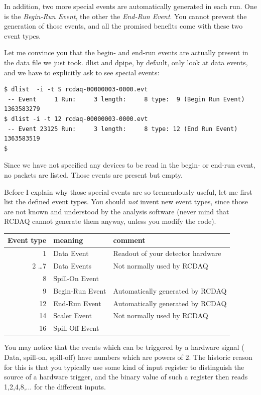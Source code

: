 \documentclass{article}[11pt]
\begin{document}
In addition, two more special events are automatically generated in
each run.  One is the \emph{Begin-Run Event}, the other the
\emph{End-Run Event}. You cannot prevent the generation of those
events, and all the promised benefits come with these two event types.

Let me convince you that the begin- and end-run events are actually present in
the data file we just took. dlist and dpipe, by default, only look at
data events, and we have to explicitly ask to see special events:

\begin{verbatim}
$ dlist  -i -t S rcdaq-00000003-0000.evt
 -- Event     1 Run:     3 length:     8 type:  9 (Begin Run Event)  1363583279
$ dlist -i -t 12 rcdaq-00000003-0000.evt
 -- Event 23125 Run:     3 length:     8 type: 12 (End Run Event)  1363583519
$ 
\end{verbatim}

Since we have not specified any devices to be read in the begin- or end-run event,
no packets are listed. Those events are present but empty.

Before I explain why those special events are so tremendously useful,
let me first list the defined event types. You should \emph{not}
invent new event types, since those are not known and understood by the
analysis software (never mind that RCDAQ cannot generate them anyway,
unless you modify the code).

\begin{center}
\begin{tabular}{|r|l|l|}
\hline
Event type & meaning & comment \\
\hline
\hline
    1 & Data Event &  Readout of your detector hardware\\ \hline
    2 \dots 7 & Data Events & Not normally used by RCDAQ \\ \hline
    8  & Spill-On Event &  \\ \hline
    9  & Begin-Run Event & Automatically generated by RCDAQ \\ \hline
    12 & End-Run Event & Automatically generated by RCDAQ  \\ \hline
    14 & Scaler Event  & Not normally used by RCDAQ \\ \hline
    16 & Spill-Off Event  &  \\ \hline
\hline
\end{tabular}
\end{center}

You may notice that the events which can be triggered by a hardware
signal ( Data, spill-on, spill-off) have numbers which are powers of
2. The historic reason for this is that you typically use some kind of
input register to distinguish the source of a hardware trigger, and
the binary value of such a register then reads 1,2,4,8,... for the different
inputs.
\end{document}
